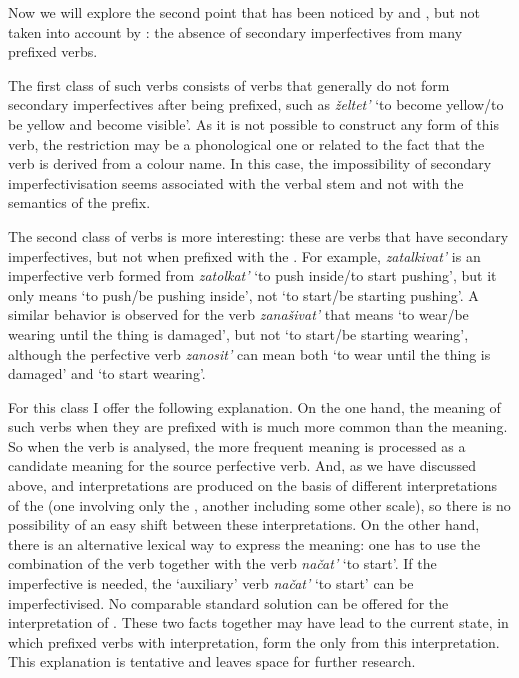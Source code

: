 Now we will explore the second point that has been noticed by \citet{Svenonius:04b} and \citet{Braginsky:08}, but not taken into account by \citet{Tatevosov:09}: the absence of secondary imperfectives from many  prefixed verbs. 

The first class of such verbs consists of verbs that generally do not form secondary imperfectives after being prefixed, such as \textit{\v{z}eltet'} `to become yellow/to be yellow and become visible'. As it is not possible to construct any  form of this verb, the restriction may be a phonological one or related to the fact that the verb is derived from a colour name. In this case, the impossibility of secondary imperfectivisation seems associated with the verbal stem and not with the  semantics of the prefix. 

The second class of verbs is more interesting: these are verbs that have secondary imperfectives, but not when prefixed with the  . For example, \textit{zatalkivat'} is an imperfective verb formed from \textit{zatolkat'} `to push inside/to start pushing', but it only means `to push/be pushing inside', not `to start/be starting pushing'. A similar behavior is observed for the verb \textit{zana\v{s}ivat'} that means `to wear/be wearing until the thing is damaged', but not `to start/be starting wearing', although the perfective verb \textit{zanosit'} can mean both `to wear until the thing is damaged' and `to start wearing'.

For this class I offer the following explanation. On the one hand, the  meaning of such verbs when they are prefixed with  is much more common than the  meaning. So when the  verb is analysed, the more frequent meaning is processed as a candidate meaning for the source perfective verb. And, as we have discussed above,  and  interpretations are produced on the basis of different interpretations of the  (one involving only the , another including some other scale), so there is no possibility of an easy shift between these interpretations. On the other hand, there is an alternative lexical way to express the  meaning: one has to use the combination of the  verb together with the verb \textit{na\v{c}at'} `to start'. If the imperfective is needed, the `auxiliary' verb \textit{na\v{c}at'} `to start' can be imperfectivised. No comparable standard solution can be offered for the  interpretation of . These two facts together may have lead to the current state, in which prefixed verbs with  interpretation, form the  only from this interpretation. This explanation is tentative and leaves space for further research.

